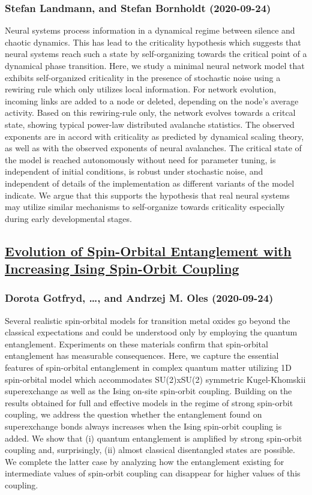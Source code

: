 \subsubsection*{Stefan Landmann, and Stefan Bornholdt (2020-09-24)}
Neural systems process information in a dynamical regime between silence and
chaotic dynamics. This has lead to the criticality hypothesis which suggests
that neural systems reach such a state by self-organizing towards the critical
point of a dynamical phase transition. Here, we study a minimal neural network
model that exhibits self-organized criticality in the presence of stochastic
noise using a rewiring rule which only utilizes local information. For network
evolution, incoming links are added to a node or deleted, depending on the
node's average activity. Based on this rewiring-rule only, the network evolves
towards a critcal state, showing typical power-law distributed avalanche
statistics. The observed exponents are in accord with criticality as predicted
by dynamical scaling theory, as well as with the observed exponents of neural
avalanches. The critical state of the model is reached autonomously without
need for parameter tuning, is independent of initial conditions, is robust
under stochastic noise, and independent of details of the implementation as
different variants of the model indicate. We argue that this supports the
hypothesis that real neural systems may utilize similar mechanisms to
self-organize towards criticality especially during early developmental stages.

\subsection*{\href{http://arxiv.org/abs/2009.11773v1}{Evolution of Spin-Orbital Entanglement with Increasing Ising Spin-Orbit  Coupling}}
\subsubsection*{Dorota Gotfryd, \dots, and Andrzej M. Oles (2020-09-24)}
Several realistic spin-orbital models for transition metal oxides go beyond
the classical expectations and could be understood only by employing the
quantum entanglement. Experiments on these materials confirm that spin-orbital
entanglement has measurable consequences. Here, we capture the essential
features of spin-orbital entanglement in complex quantum matter utilizing 1D
spin-orbital model which accommodates SU(2)xSU(2) symmetric Kugel-Khomskii
superexchange as well as the Ising on-site spin-orbit coupling. Building on the
results obtained for full and effective models in the regime of strong
spin-orbit coupling, we address the question whether the entanglement found on
superexchange bonds always increases when the Ising spin-orbit coupling is
added. We show that (i) quantum entanglement is amplified by strong spin-orbit
coupling and, surprisingly, (ii) almost classical disentangled states are
possible. We complete the latter case by analyzing how the entanglement
existing for intermediate values of spin-orbit coupling can disappear for
higher values of this coupling.

